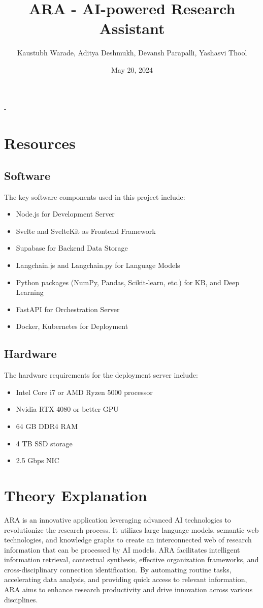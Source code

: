 -
\usepackage{graphicx}

\title{ARA - AI-powered Research Assistant}
\author{Kaustubh Warade, Aditya Deshmukh, Devansh Parapalli, Yashasvi Thool}
\date{May 20, 2024}


\maketitle

\section*{Resources}
\subsection*{Software}
The key software components used in this project include:
\begin{itemize}
    \item Node.js for Development Server
    \item Svelte and SvelteKit as Frontend Framework
    \item Supabase for Backend Data Storage
    \item Langchain.js and Langchain.py for Language Models
    \item Python packages (NumPy, Pandas, Scikit-learn, etc.) for KB, and Deep Learning
    \item FastAPI for Orchestration Server
    \item Docker, Kubernetes for Deployment
\end{itemize}

\subsection*{Hardware}
The hardware requirements for the deployment server include:
\begin{itemize}
    \item Intel Core i7 or AMD Ryzen 5000 processor
    \item Nvidia RTX 4080 or better GPU
    \item 64 GB DDR4 RAM
    \item 4 TB SSD storage
    \item 2.5 Gbps NIC
\end{itemize}

\section*{Theory Explanation}
ARA is an innovative application leveraging advanced AI technologies to revolutionize the research process. It utilizes large language models, semantic web technologies, and knowledge graphs to create an interconnected web of research information that can be processed by AI models. ARA facilitates intelligent information retrieval, contextual synthesis, effective organization frameworks, and cross-disciplinary connection identification. By automating routine tasks, accelerating data analysis, and providing quick access to relevant information, ARA aims to enhance research productivity and drive innovation across various disciplines.

